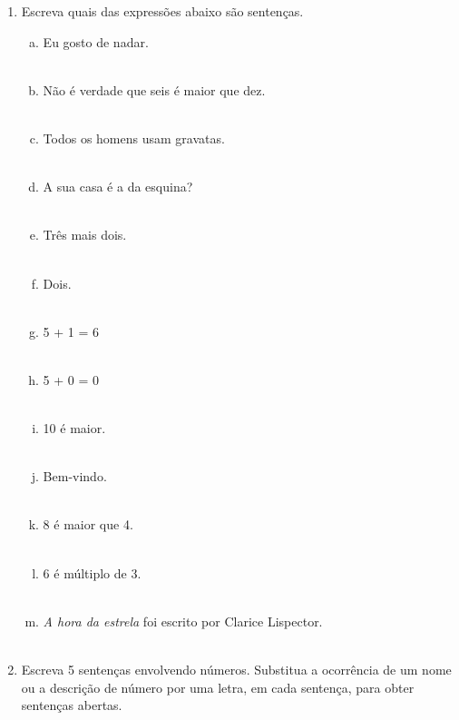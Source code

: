 \documentclass[a4paper,14pt]{article}
\begin{document}
    \begin{multicols}{2}
    	\begin{enumerate}
    		\item Escreva quais das expressões abaixo são sentenças.
    		\begin{enumerate}[a)]
    			\item Eu gosto de nadar. \\\\
    			\item Não é verdade que seis é maior que dez. \\\\
    			\item Todos os homens usam gravatas. \\\\
    			\item A sua casa é a da esquina? \\\\
    			\item Três mais dois. \\\\
    			\item Dois. \\\\
    			\item 5 + 1 = 6 \\\\
    			\item 5 + 0 = 0 \\\\
    			\item 10 é maior. \\\\
    			\item Bem-vindo. \\\\
    			\item 8 é maior que 4. \\\\
    			\item 6 é múltiplo de 3. \\\\
    			\item \textit{A hora da estrela} foi escrito por Clarice Lispector. \\\\
    		\end{enumerate}
    		\item Escreva 5 sentenças envolvendo números. Substitua a ocorrência de um nome ou a descrição de número por uma letra, em cada sentença, para obter sentenças abertas.
    		

\end{enumerate}
\end{multicols}
\end{document}
